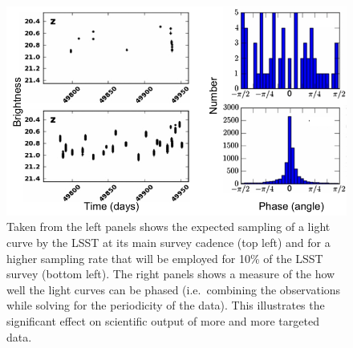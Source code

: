 \documentclass[prd,nofootbib,floatfix,11pt,tightenlines]{revtex4}
\begin{document}
%




\begin{figure}[th]
\centerline{
\includegraphics[scale=1.0]{rrlyrae.png}
}
\caption{
Taken from \citet{rrlyrae} the left panels shows the expected
sampling of
a light curve by the LSST at its main survey cadence (top left) and
for a higher sampling rate that will be employed for 10\% of the LSST
survey (bottom left). The right panels shows a measure of the  how well
the light curves can be phased (i.e.\ combining the observations while solving
for the periodicity of the data). This illustrates the significant effect
on scientific output of more and more targeted data.}

\label{fig:RRLyrae}
\end{figure}
\end{document}
